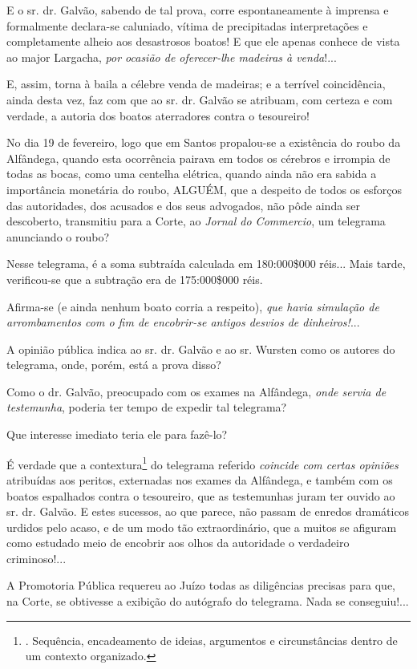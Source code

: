 E o sr. dr. Galvão, sabendo de tal prova, corre espontaneamente à
imprensa e formalmente declara-se caluniado, vítima de precipitadas
interpretações e completamente alheio aos desastrosos boatos! E que ele
apenas conhece de vista ao major Largacha, \emph{por ocasião de
oferecer-lhe madeiras à venda}!...

E, assim, torna à baila a célebre venda de madeiras; e a terrível
coincidência, ainda desta vez, faz com que ao sr. dr. Galvão se
atribuam, com certeza e com verdade, a autoria dos boatos aterradores
contra o tesoureiro!

No dia 19 de fevereiro, logo que em Santos propalou-se a existência do
roubo da Alfândega, quando esta ocorrência pairava em todos os cérebros
e irrompia de todas as bocas, como uma centelha elétrica, quando ainda
não era sabida a importância monetária do roubo, ALGUÉM, que a despeito
de todos os esforços das autoridades, dos acusados e dos seus advogados,
não pôde ainda ser descoberto, transmitiu para a Corte, ao \emph{Jornal
do Commercio}, um telegrama anunciando o roubo?

Nesse telegrama, é a soma subtraída calculada em 180:000\$000 réis...
Mais tarde, verificou-se que a subtração era de 175:000\$000 réis.

Afirma-se (e ainda nenhum boato corria a respeito), \emph{que havia
simulação de arrombamentos com o fim de encobrir-se antigos desvios de
dinheiros!}...

A opinião pública indica ao sr. dr. Galvão e ao sr. Wursten como os
autores do telegrama, onde, porém, está a prova disso?

Como o dr. Galvão, preocupado com os exames na Alfândega, \emph{onde
servia de testemunha}, poderia ter tempo de expedir tal telegrama?

Que interesse imediato teria ele para fazê-lo?

É verdade que a contextura\footnote{. Sequência, encadeamento de ideias,
  argumentos e circunstâncias dentro de um contexto organizado.} do
telegrama referido \emph{coincide com certas opiniões} atribuídas aos
peritos, externadas nos exames da Alfândega, e também com os boatos
espalhados contra o tesoureiro, que as testemunhas juram ter ouvido ao
sr. dr. Galvão. E estes sucessos, ao que parece, não passam de enredos
dramáticos urdidos pelo acaso, e de um modo tão extraordinário, que a
muitos se afiguram como estudado meio de encobrir aos olhos da
autoridade o verdadeiro criminoso!...

A Promotoria Pública requereu ao Juízo todas as diligências precisas
para que, na Corte, se obtivesse a exibição do autógrafo do telegrama.
Nada se conseguiu!...

